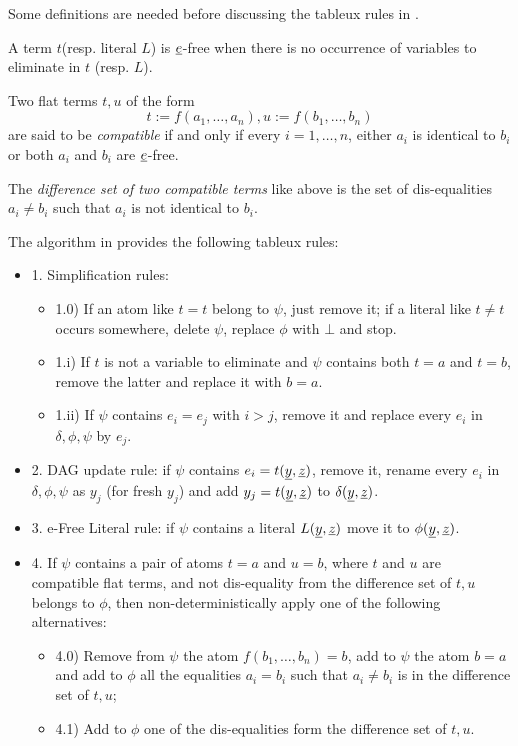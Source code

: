 Some definitions are needed before discussing the tableux rules in 
\cite{ghilardi2020compactly}.

\begin{definition}
  A term $t$(resp. literal $L$) is $\underline{e}$-free when there is no occurrence
  of variables to eliminate in $t$ (resp. $L$).

  Two flat terms $t, u$ of the form 
  \begin{equation*}
    t := f(a_1, \dots, a_n), u := f(b_1, \dots, b_n)
  \end{equation*}
  are said to be \emph{compatible} if and only if every $i = 1, \dots, n$, either
  $a_i$ is identical to $b_i$ or both $a_i$ and $b_i$ are $\underline{e}$-free.

  The \emph{difference set of two compatible terms} like above is the
  set of dis-equalities $a_i \neq b_i$ such that $a_i$ is not identical
  to $b_i$.
\end{definition}

The algorithm in \cite{ghilardi2020compactly} provides the following 
tableux rules:

\begin{itemize}
  \item[] 1. Simplification rules:
    \begin{itemize}
      \item 1.0) If an atom like $t = t$ belong to $\psi$, just remove it; if a
      literal like $t \neq t$ occurs somewhere, delete $\psi$, replace $\phi$
      with $\bot$ and stop.
    \item 1.i) If $t$ is not a variable to eliminate and $\psi$ contains
    both $t = a$ and $t = b$, remove the latter and replace it with $b = a$.
  \item 1.ii) If $\psi$ contains $e_i = e_j$ with $i > j$, remove it
  and replace every $e_i$ in $\delta, \phi, \psi$ by $e_j$.
    \end{itemize}
  \item[] 2. DAG update rule: if $\psi$ contains $e_i = t(\underline{y}, \underline{z})$, remove
    it, rename every $e_i$ in $\delta, \phi, \psi$ as $y_j$ (for fresh $y_j$)
    and add $y_j = t(\underline{y}, \underline{z})$ to $\delta(\underline{y}, \underline{z})$.
  \item[] 3.  e-Free Literal rule: if $\psi$ contains a literal $L(\underline{y}, \underline{z})$
    move it to $\phi(\underline{y}, \underline{z})$.
  \item[] 4.  If $\psi$ contains a pair of atoms $t = a$ and $u = b$, where
    $t$ and $u$ are compatible flat terms, and not dis-equality from the difference
    set of $t, u$ belongs to $\phi$, then non-deterministically apply one of the
    following alternatives:
    \begin{itemize}
      \item 4.0) Remove from $\psi$ the atom $f(b_1, \dots, b_n) = b$, add
      to $\psi$ the atom $b = a$ and add to $\phi$ all the equalities
      $a_i = b_i$ such that $a_i \neq b_i$ is in the difference set of $t, u$;
      \item 4.1) Add to $\phi$ one of the dis-equalities form the difference
      set of $t, u$.
    \end{itemize}
\end{itemize}

